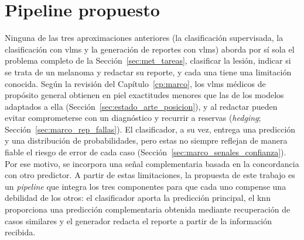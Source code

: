 \section{Pipeline propuesto}
\label{sec:met_pipeline}



Ninguna de las tres aproximaciones anteriores (la clasificación supervisada, la clasificación con \glspl{vlm} y la
generación de reportes con \glspl{vlm}) aborda por sí sola el problema completo de la Sección~\ref{sec:met_tareas},
clasificar la lesión, indicar si se trata de un melanoma y redactar su reporte, y cada una tiene una limitación conocida. Según la revisión
del Capítulo~\ref{cp:marco}, los \glspl{vlm} médicos de propósito general obtienen en piel exactitudes menores que las
de los modelos adaptados a ella (Sección~\ref{sec:estado_arte_posicion}), y al redactar pueden evitar comprometerse
con un diagnóstico y recurrir a reservas (\emph{hedging}; Sección~\ref{sec:marco_rep_fallas}). El clasificador, a su vez, entrega una predicción y una distribución de probabilidades, pero estas no siempre reflejan de manera fiable el riesgo de error de cada caso (Sección~\ref{sec:marco_senales_confianza}). Por ese motivo, se incorpora una señal complementaria basada en la concordancia con otro predictor. A partir de estas
limitaciones, la propuesta de este trabajo es un \emph{pipeline} que integra los tres componentes para que cada uno
compense una debilidad de los otros: el clasificador aporta la predicción principal, el \gls{knn} proporciona una predicción complementaria obtenida mediante recuperación de casos similares y el generador redacta el reporte a partir de la información recibida.

